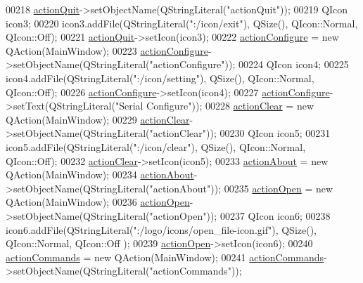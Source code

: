 \begin{DoxyCode}
00218         \hyperlink{a00080_a188c243f36a2dbc10e4e2a0ad94273b1}{actionQuit}->setObjectName(QStringLiteral(\textcolor{stringliteral}{"actionQuit"}));
00219         QIcon icon3;
00220         icon3.addFile(QStringLiteral(\textcolor{stringliteral}{":/icon/exit"}), QSize(), QIcon::Normal, QIcon::Off);
00221         \hyperlink{a00080_a188c243f36a2dbc10e4e2a0ad94273b1}{actionQuit}->setIcon(icon3);
00222         \hyperlink{a00080_a3860abde3cfd3f6170e28fddde73f11e}{actionConfigure} = \textcolor{keyword}{new} QAction(MainWindow);
00223         \hyperlink{a00080_a3860abde3cfd3f6170e28fddde73f11e}{actionConfigure}->setObjectName(QStringLiteral(\textcolor{stringliteral}{"actionConfigure"}));
00224         QIcon icon4;
00225         icon4.addFile(QStringLiteral(\textcolor{stringliteral}{":/icon/setting"}), QSize(), QIcon::Normal, QIcon::Off);
00226         \hyperlink{a00080_a3860abde3cfd3f6170e28fddde73f11e}{actionConfigure}->setIcon(icon4);
00227         \hyperlink{a00080_a3860abde3cfd3f6170e28fddde73f11e}{actionConfigure}->setText(QStringLiteral(\textcolor{stringliteral}{"Serial Configure"}));
00228         \hyperlink{a00080_ac8539dcd87955047877cb256aff60453}{actionClear} = \textcolor{keyword}{new} QAction(MainWindow);
00229         \hyperlink{a00080_ac8539dcd87955047877cb256aff60453}{actionClear}->setObjectName(QStringLiteral(\textcolor{stringliteral}{"actionClear"}));
00230         QIcon icon5;
00231         icon5.addFile(QStringLiteral(\textcolor{stringliteral}{":/icon/clear"}), QSize(), QIcon::Normal, QIcon::Off);
00232         \hyperlink{a00080_ac8539dcd87955047877cb256aff60453}{actionClear}->setIcon(icon5);
00233         \hyperlink{a00080_abdf2b43167c2cd0d3405f90b8c30e934}{actionAbout} = \textcolor{keyword}{new} QAction(MainWindow);
00234         \hyperlink{a00080_abdf2b43167c2cd0d3405f90b8c30e934}{actionAbout}->setObjectName(QStringLiteral(\textcolor{stringliteral}{"actionAbout"}));
00235         \hyperlink{a00080_a5772f39001f62b7f601aafe72caa10c0}{actionOpen} = \textcolor{keyword}{new} QAction(MainWindow);
00236         \hyperlink{a00080_a5772f39001f62b7f601aafe72caa10c0}{actionOpen}->setObjectName(QStringLiteral(\textcolor{stringliteral}{"actionOpen"}));
00237         QIcon icon6;
00238         icon6.addFile(QStringLiteral(\textcolor{stringliteral}{":/logo/icons/open\_file-icon.gif"}), QSize(), QIcon::Normal, QIcon::Off
      );
00239         \hyperlink{a00080_a5772f39001f62b7f601aafe72caa10c0}{actionOpen}->setIcon(icon6);
00240         \hyperlink{a00080_a3dccdc21d3df68b86550093b5e3c0356}{actionCommands} = \textcolor{keyword}{new} QAction(MainWindow);
00241         \hyperlink{a00080_a3dccdc21d3df68b86550093b5e3c0356}{actionCommands}->setObjectName(QStringLiteral(\textcolor{stringliteral}{"actionCommands"}));

\end{DoxyCode}
